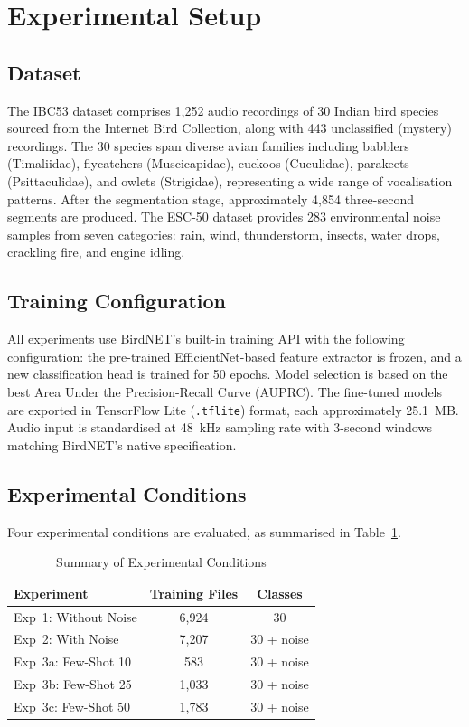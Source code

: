 \documentclass[conference]{IEEEtran}
\begin{document}
\section{Experimental Setup}

\subsection{Dataset}

The IBC53 dataset \cite{b3} comprises 1,252 audio recordings of 30 Indian bird species sourced from the Internet Bird Collection, along with 443 unclassified (mystery) recordings. The 30 species span diverse avian families including babblers (Timaliidae), flycatchers (Muscicapidae), cuckoos (Cuculidae), parakeets (Psittaculidae), and owlets (Strigidae), representing a wide range of vocalisation patterns. After the segmentation stage, approximately 4,854 three-second segments are produced. The ESC-50 dataset \cite{b2} provides 283 environmental noise samples from seven categories: rain, wind, thunderstorm, insects, water drops, crackling fire, and engine idling.

\subsection{Training Configuration}

All experiments use BirdNET's built-in training API with the following configuration: the pre-trained EfficientNet-based feature extractor is frozen, and a new classification head is trained for 50 epochs. Model selection is based on the best Area Under the Precision-Recall Curve (AUPRC). The fine-tuned models are exported in TensorFlow Lite (\texttt{.tflite}) format, each approximately 25.1~MB. Audio input is standardised at 48~kHz sampling rate with 3-second windows matching BirdNET's native specification.

\subsection{Experimental Conditions}

Four experimental conditions are evaluated, as summarised in Table~\ref{tab:experiments}.

\begin{table}[htbp]
\caption{Summary of Experimental Conditions}
\label{tab:experiments}
\centering
\begin{tabular}{lcc}
\toprule
\textbf{Experiment} & \textbf{Training Files} & \textbf{Classes} \\
\midrule
Exp~1: Without Noise & 6,924 & 30 \\
Exp~2: With Noise & 7,207 & 30 + noise \\
Exp~3a: Few-Shot 10 & 583 & 30 + noise \\
Exp~3b: Few-Shot 25 & 1,033 & 30 + noise \\
Exp~3c: Few-Shot 50 & 1,783 & 30 + noise \\
\bottomrule
\end{tabular}
\end{table}
\end{document}

